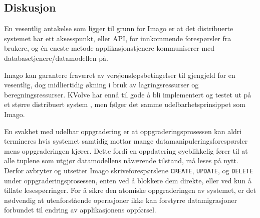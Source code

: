 \subsection{Diskusjon}
En vesentlig antakelse som ligger til grunn for Imago er at det distribuerte systemet har ett aksesspunkt, eller API, for innkommende forespørsler fra brukere, og én eneste metode applikasjonstjenere kommuniserer med databasetjenere/datamodellen på.

Imago kan garantere fraværet av versjonsløpsbetingelser til gjengjeld for en vesentlig, dog midliertidig økning i bruk av lagringsressurser og beregningsressurser. KVolve har ennå til gode å bli implementert og testet ut på et større distribuert system \citep{saur2016}, men følger det samme udelbarhetsprinsippet som Imago.

En svakhet med udelbar oppgradering er at oppgraderingsprosessen kan aldri termineres hvis systemet samtidig mottar mange datamanipuleringsforespørsler mens oppgraderingen kjører. Dette fordi en oppdatering øyeblikkelig fører til at alle tuplene som utgjør datamodellens nåværende tilstand, må leses på nytt. Derfor avbryter og utsetter Imago skriveforespørslene \texttt{CREATE}, \texttt{UPDATE}, og \texttt{DELETE} under oppgraderingsprosessen, enten ved å blokkere dem direkte, eller ved kun å tillate lesespørringer. For å sikre den atomiske oppgraderingen av systemet, er det nødvendig at utenforstående operasjoner ikke kan forstyrre datamigrasjoner forbundet til endring av applikasjonens oppførsel.

